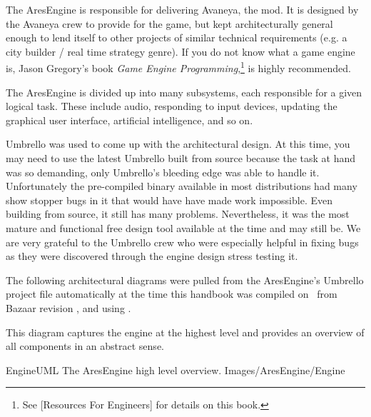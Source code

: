 

The AresEngine is responsible for delivering Avaneya, the mod. It is designed by the Avaneya crew to provide for the game, but kept architecturally general enough to lend itself to other projects of similar technical requirements (e.g. a city builder / real time strategy genre). If you do not know what a game engine is, Jason Gregory's book {\it Game Engine Programming},\footnote{See [Resources For Engineers] for details on this book.} is highly recommended.

The AresEngine is divided up into many subsystems, each responsible for a given logical task. These include audio, responding to input devices, updating the graphical user interface, artificial intelligence, and so on.

Umbrello was used to come up with the architectural design. At this time, you may need to use the latest Umbrello built from source because the task at hand was so demanding, only Umbrello's bleeding edge was able to handle it. Unfortunately the pre-compiled binary available in most distributions had many show stopper bugs in it that would have have made work impossible. Even building from source, it still has many problems. Nevertheless, it was the most mature and functional free design tool available at the time and may still be. We are very grateful to the Umbrello crew who were especially helpful in fixing bugs as they were discovered through the engine design stress testing it.

The following architectural diagrams were pulled from the AresEngine's Umbrello project file automatically at the time this handbook was compiled on \currentdate\ from Bazaar revision , and using .

This diagram captures the engine at the highest level and provides an overview of all components in an abstract sense.

\FullPageLandscapeDiagram
    {EngineUML}
    {The AresEngine high level overview.}
    {Images/AresEngine/Engine}

